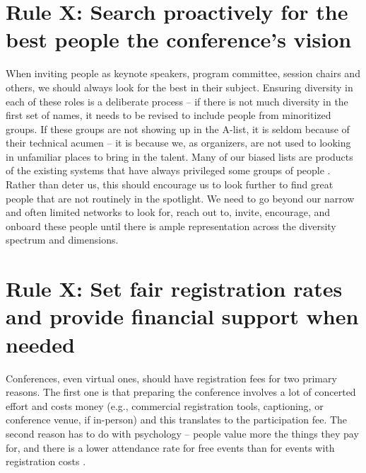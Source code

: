 \documentclass[10pt,letterpaper]{article}
\begin{document}
\section{Rule X: Search proactively for the best people the conference's vision}
\label{rule_presenters}
When inviting people as keynote speakers, program committee, session chairs and others, we should always look for the best in their subject. Ensuring diversity in each of these roles is a deliberate process -- if there is not much diversity in the first set of names, it needs to be revised to include people from minoritized groups. If these groups are not showing up in the A-list, it is seldom because of their technical acumen -- it is because we, as organizers, are not used to looking in unfamiliar places to bring in the talent. Many of our biased lists are products of the existing systems that have always privileged some groups of people \cite{dwyerNoticeWhoScience2021,sarabipourChangingScientificMeetings2021}. Rather than deter us, this should encourage us to look further to find great people that are not routinely in the spotlight. We need to go beyond our narrow and often limited networks to look for, reach out to, invite, encourage, and onboard these people until there is ample representation across the diversity spectrum and dimensions. 




\section{Rule X: Set fair registration rates and provide financial support when needed}

Conferences, even virtual ones, should have registration fees for two primary reasons. The first one is that preparing the conference involves a lot of concerted effort and costs money (e.g., commercial registration tools, captioning, or conference venue, if in-person) and this translates to the participation fee. The second reason has to do with psychology -- people value more the things they pay for, and there is a lower attendance rate for free events than for events with registration costs \cite{eventbrite_ultimate_2017}. 
\end{document}
